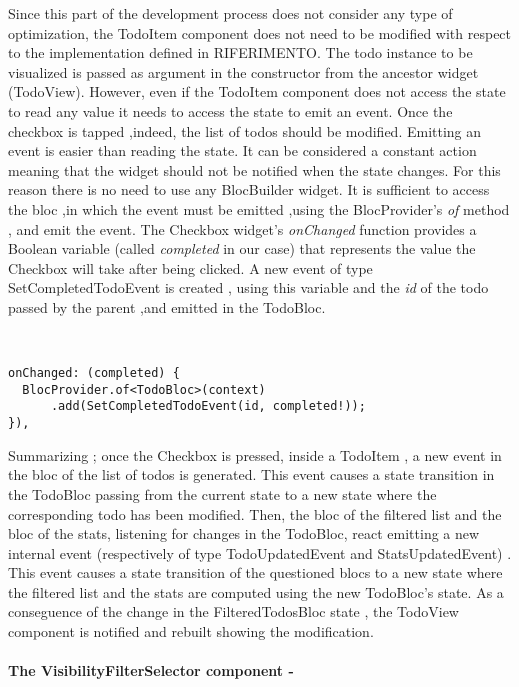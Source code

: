 Since this part of the development process does not consider any type of optimization, the TodoItem component does not need to be modified with respect to the implementation defined in RIFERIMENTO. The todo instance to be visualized is passed as argument in the constructor from the ancestor widget (TodoView). However, even if the TodoItem component does not access the state to read any value it needs to access the state to emit an event. Once the checkbox is tapped ,indeed, the list of todos should be modified. Emitting an event is easier than reading the state. It can be considered a constant action meaning that the widget should not be notified when the state changes. For this reason there is no need to use any BlocBuilder widget. It is sufficient to access the bloc ,in which the event must be emitted ,using the BlocProvider’s \textit{of} method , and emit the event. The Checkbox widget’s \textit{onChanged} function provides a Boolean variable (called \textit{completed} in our case) that represents the value the Checkbox will take after being clicked.  A new event of type SetCompletedTodoEvent is created , using this variable and the \textit{id} of the todo passed by the parent ,and emitted in the TodoBloc.
\begin{code}
\mbox{}\\
 \mbox{}
\label{code:2.14}
\begin{verbatim}
onChanged: (completed) {
  BlocProvider.of<TodoBloc>(context)
      .add(SetCompletedTodoEvent(id, completed!));
}),
\end{verbatim}
\mbox{}
\end{code}

Summarizing ;  once the Checkbox is pressed, inside a TodoItem , a new event in the bloc of the list of todos is generated. This event causes a state transition in the TodoBloc passing from the current state to a new state where the corresponding todo has been modified. Then, the bloc of the filtered list and the bloc of the stats, listening for changes in the TodoBloc, react emitting a new internal event (respectively of type TodoUpdatedEvent and StatsUpdatedEvent) . This event causes a state transition of the questioned blocs to a new state where the filtered list and the stats are computed using the new TodoBloc’s state. As a conseguence of the change in the FilteredTodosBloc state , the TodoView component is notified and rebuilt showing the modification.
\paragraph{The VisibilityFilterSelector component - }
\label{subpar:todo_app_bloc_core_state}

